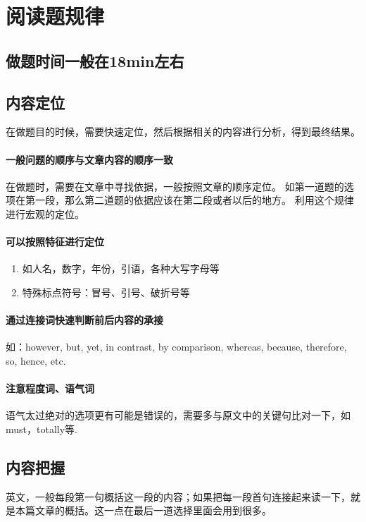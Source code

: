 \documentclass[a4paper]{ctexart}
\begin{document}
\section{阅读题规律}
\subsection{做题时间一般在18min左右}
\subsection{内容定位}
在做题目的时候，需要快速定位，然后根据相关的内容进行分析，得到最终结果。

\paragraph{一般问题的顺序与文章内容的顺序一致}
在做题时，需要在文章中寻找依据，一般按照文章的顺序定位。 如第一道题的选项在第一段，那么第二道题的依据应该在第二段或者以后的地方。 利用这个规律进行宏观的定位。

\paragraph{可以按照特征进行定位}
\begin{enumerate}
    \item 如人名，数字，年份，引语，各种大写字母等 
    \item 特殊标点符号：冒号、引号、破折号等
\end{enumerate}

\paragraph{通过连接词快速判断前后内容的承接}
如：however, but, yet, in contrast, by comparison, whereas, because, therefore, so, hence, etc.

\paragraph{注意程度词、语气词}
语气太过绝对的选项更有可能是错误的，需要多与原文中的关键句比对一下，如must，totally等.

\subsection{内容把握}
英文，一般每段第一句概括这一段的内容；如果把每一段首句连接起来读一下，就是本篇文章的概括。这一点在最后一道选择里面会用到很多。
\end{document}
